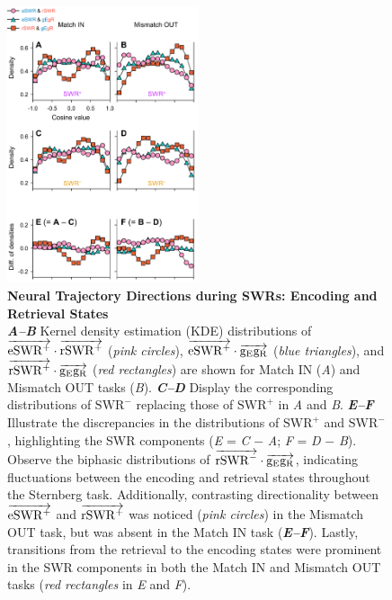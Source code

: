 \documentclass[final,3p,times,twocolumn]{elsarticle}
\begin{document}
        \clearpage
        \begin{figure}[ht]
        	\centering
            \includegraphics[width=0.5\textwidth]{./src/figures/.png/Figure_ID_07.png}
        	\caption{\textbf{
Neural Trajectory Directions during SWRs: Encoding and Retrieval States
}
\smallskip
\\
\textbf{\textit{A--B}} Kernel density estimation (KDE) distributions of $\protect\overrightarrow{{\mathrm{eSWR^+}}} \cdot \protect\overrightarrow{{\mathrm{rSWR^+}}}$ (\textit{pink circles}), $\protect\overrightarrow{{\mathrm{eSWR^+}}} \cdot \protect\overrightarrow{{\mathrm{g_{E}g_{R}}}}$ (\textit{blue triangles}), and $\protect\overrightarrow{{\mathrm{rSWR^+}}} \cdot \protect\overrightarrow{{\mathrm{g_{E}g_{R}}}}$ (\textit{red rectangles}) are shown for Match IN (\textit{A}) and Mismatch OUT tasks (\textit{B}). \textbf{\textit{C--D}} Display the corresponding distributions of $\mathrm{SWR^-}$ replacing those of $\mathrm{SWR^+}$ in \textit{A} and \textit{B}. \textbf{\textit{E--F}} Illustrate the discrepancies in the distributions of $\mathrm{SWR^+}$ and $\mathrm{SWR^-}$, highlighting the SWR components (\textit{E} = \textit{C} $-$ \textit{A}; \textit{F} = \textit{D} $-$ \textit{B}). Observe the biphasic distributions of $\protect\overrightarrow{{\mathrm{rSWR^-}}} \cdot \protect\overrightarrow{{\mathrm{g_{E}g_{R}}}}$, indicating fluctuations between the encoding and retrieval states throughout the Sternberg task. Additionally, contrasting directionality between $\protect\overrightarrow{{\mathrm{eSWR^+}}}$ and $\protect\overrightarrow{{\mathrm{rSWR^+}}}$ was noticed (\textit{pink circles}) in the Mismatch OUT task, but was absent in the Match IN task (\textbf{\textit{E--F}}). Lastly, transitions from the retrieval to the encoding states were prominent in the SWR components in both the Match IN and Mismatch OUT tasks (\textit{red rectangles} in \textit{E} and \textit{F}).
}
        	\label{fig:07}
        \end{figure}

\end{document}
